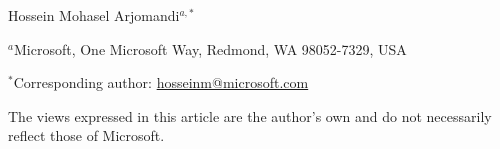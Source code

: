 \documentclass[12pt]{article}
\begin{document}
\begin{center}
{\Large\bfseries \papertitle\par}
\vspace{1cm}
Hossein Mohasel Arjomandi$^{a,*}$\par
\vspace{0.5cm}
$^a$Microsoft, One Microsoft Way, Redmond, WA 98052-7329, USA\par
\vspace{0.5cm}
$^*$Corresponding author: \href{mailto:hosseinm@microsoft.com}{hosseinm@microsoft.com}
\end{center}
\vspace{1cm}
\noindent The views expressed in this article are the author's own and do not necessarily reflect those of Microsoft.
\end{document}
